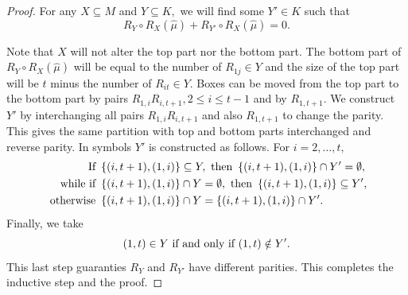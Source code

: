\documentclass[11pt]{amsart}
\newcommand{\tn}[1]{\textnormal{#1}}
\begin{document}
\begin{proof}
For any $X \subseteq M$ and $Y \subseteq K,$ we will find some $Y' \in K$ such that
\[R_Y \circ R_X (\hat{\mu}) + R_{Y'} \circ R_X (\hat{\mu}) = 0.\]

Note that $X$ will not alter the top part nor the bottom part. The bottom part of 
$R_Y \circ R_X (\hat{\mu})$ will be equal to the number of $R_{1j}\in Y$ and the size of the top part will be $t$ minus the number of $R_{it}\in Y$. Boxes can be moved from the top part to the bottom part by  pairs 
$R_{1,i}R_{i,t+1}, 2\le i\le t-1$ and by $R_{1,t+1}$. We construct $Y'$ by interchanging all pairs $R_{1,i}R_{i,t+1}$ and also $R_{1,t+1}$ to change the parity. This gives the same partition with top and bottom parts interchanged and reverse parity.
In symbols $Y'$ is constructed as follows. For $i=2,\ldots, t,$
\begin{align*}
\tn{ If } &\left\{(i,t+1), (1, i)\right\} \subseteq Y, \tn{ then }  \left\{(i,t+1), (1, i)\right\} \cap Y'=\emptyset,\\
\tn{ while if } &\left\{(i,t+1), (1, i)\right\} \cap Y = \emptyset, \tn{ then }  \left\{(i,t+1), (1, i)\right\} \subseteq Y',\\
\tn{ otherwise } &\left\{(i,t+1), (1, i)\right\} \cap Y = \left\{(i,t+1), (1, i)\right\} \cap Y'.
\end{align*}
Finally, we take 
\[(1,t) \in Y \tn{ if and only if }(1,t) \notin Y'.\]
This last step guaranties $R_Y$ and $R_{Y'}$ have different parities. This completes the inductive step and the proof.
\end{proof}
\end{document}

